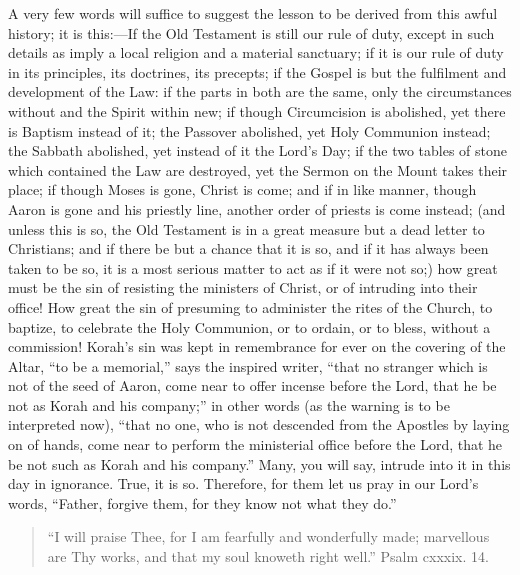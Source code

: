 A very few words will suffice to suggest the lesson to be derived
from this awful history; it is this:—If the Old Testament is still
our rule of duty, except in such details as imply a local religion and
a material sanctuary; if it is our rule of duty in its principles, its
doctrines, its precepts; if the Gospel is but the fulfilment and
development of the Law: if the parts in both are the same, only the
circumstances without and the Spirit within new; if though
Circumcision is abolished, yet there is Baptism instead of it; the
Passover abolished, yet Holy Communion instead; the Sabbath abolished,
yet instead of it the Lord's Day; if the two tables of stone which
contained the Law are destroyed, yet the Sermon on the Mount takes
their place; if though Moses is gone, Christ is come; and if in like
manner, though Aaron is gone and his priestly line, another order of
priests is come instead; (and unless this is so, the Old Testament is
in a great measure but a dead letter to Christians; and if there be
but a chance that it is so, and if it has always been taken to be so,
it is a most serious matter to act as if it were not so;) how great
must be the sin of resisting the ministers of Christ, or of intruding
into their office! How great the sin of presuming to administer the
rites of the Church, to baptize, to celebrate the Holy Communion, or
to ordain, or to bless, without a commission! Korah's sin was kept in
remembrance for ever on the covering of the Altar, ``to be a
memorial,'' says the inspired writer, ``that no stranger which
is not of the seed of Aaron, come near to offer incense before the
Lord, that he be not as Korah and his company;'' in other words
(as the warning is to be interpreted now), ``that no one, who is
not descended from the Apostles by laying on of hands, come near to
perform the ministerial office before the Lord, that he be not such as
Korah and his company.'' Many, you will say, intrude into it in
this day in ignorance. True, it is so. Therefore, for them let us pray
in our Lord's words, ``Father, forgive them, for they know not
what they do.''


\begin{quote}

``I will praise Thee, for I am fearfully and wonderfully
made; marvellous are Thy works, and that my soul knoweth right
well.'' Psalm cxxxix. 14.

\end{quote}

